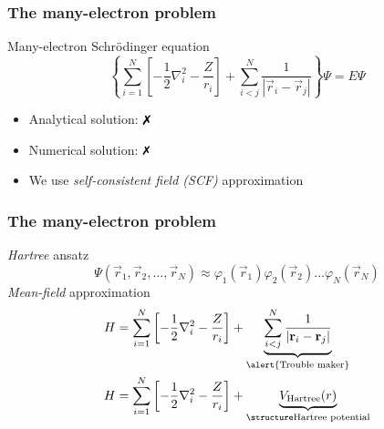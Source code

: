 \begin{frame}[t]
  \frametitle{The many-electron problem}
  Many-electron Schr{\"o}dinger equation
  \[\left\{\sum_{i=1}^N \left[ -\frac{1}{2} \nabla_i^2 - \frac{Z}{r_i} \right] + \sum_{i<j}^N \frac{1}{|\vec{r}_i - \vec{r}_j|}\right\} \Psi = E \Psi\] \pause
  \begin{itemize}
      \item {Analytical solution: \alert{$\textrm{\ding{55}}$}}
      \item {Numerical solution: \alert{$\textrm{\ding{55}}$}}
      \item {We use \emph{self-consistent field (SCF)} approximation}
  \end{itemize}
\end{frame}

\begin{frame}[t]
  \frametitle{The many-electron problem}
  \emph{Hartree} ansatz
  \[ \Psi(\vec{r}_1,\vec{r}_2,\ldots,\vec{r}_N) \approx \varphi_1(\vec{r}_1)\varphi_2(\vec{r}_2)\ldots\varphi_N(\vec{r}_N) \]
  \emph{Mean-field} approximation
  \begin{align*}
  H & = \sum_{i=1}^N \left[ -\frac{1}{2} \nabla_i^2 - \frac{Z}{r_i} \right] + \underbrace{\sum_{i<j}^N \frac{1}{|\vec{r}_i - \vec{r}_j|}}_{\text{\alert{Trouble maker}}} \\
  H & = \sum_{i=1}^N \left[ -\frac{1}{2} \nabla_i^2 - \frac{Z}{r_i} \right] + \underbrace{V_\text{Hartree}(r)}_{\text{\emph{Hartree potential}}}
  \end{align*}
\end{frame}

